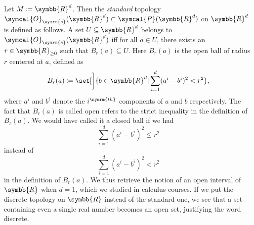 \documentclass[a4paper, 11pt]{book}
\theoremstyle{definition}
\newcommand{\rr}{\symbb{R}}
\newcommand{\topology}{\symcal{O}}
\newcommand{\powerset}{\symcal{P}}
\newcommand{\ball}{B}
\begin{document}
    Let \(M \coloneq \rr^d\). Then the \textit{standard} topology \(\topology_{\symrm{s}}(\rr^d) \subset \powerset(\rr^d)\) on \(\rr^d\) is defined as follows. A set \(U \subseteq \rr^d\) belongs to \(\topology_{\symrm{s}}(\rr^d)\) iff for all \(a \in U\), there exists an \(r \in \rr_{\geq 0}\) such that \(\ball_r(a) \subseteq U\). Here \(\ball_r(a)\) is the open ball of radius \(r\) centered at \(a\), defined as 
    \[
        \ball_r(a) \coloneq \set[\bigg]{b \in \rr^d | \sum_{i=1}^d (a^i - b^i)^2 < r^2},
    \] 
    where \(a^i\) and \(b^i\) denote the \(i^{\symrm{th}}\) components of \(a\) and \(b\) respectively. The fact that \(\ball_r(a)\) is called open refers to the strict inequality in the definition of \(\ball_r(a)\). We would have called it a closed ball if we had \[\sum_{i=1}^d (a^i - b^i)^2 \leq r^2\] instead of \[\sum_{i=1}^d (a^i - b^i)^2 < r^2\] in the definition of \(\ball_r(a)\). We thus retrieve the notion of an open interval of \(\rr\) when \(d = 1\), which we studied in calculus courses. If we put the discrete topology on \(\rr\) instead of the standard one, we see that a set containing even a single real number becomes an open set, justifying the word discrete.
\end{document}
